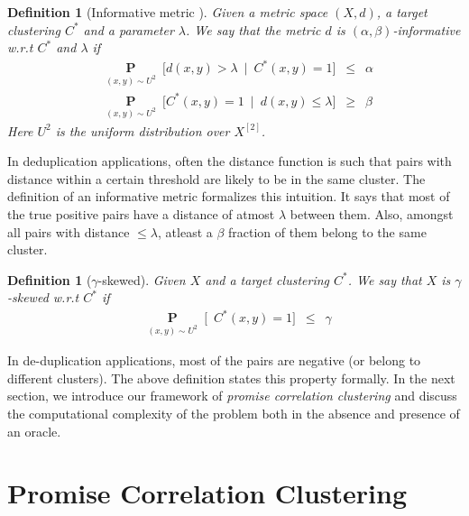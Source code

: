 \documentclass[12pt]{article}
\newtheorem{definition}[theorem]{Definition}
\newcommand{\mb}{\mathbf}
\begin{document}
\begin{definition}[Informative metric \cite{kushagra2018semisupervised}]
\label{defn:informativeMetric}
Given a metric space $(X, d)$, a target clustering $C^*$ and a parameter $\lambda$. We say that the metric $d$ is $(\alpha, \beta)$-informative w.r.t $C^*$ and $\lambda$ if
\begin{align}
	&\underset{(x, y) \sim U^2}{\mb P}\enspace \big[d(x, y) > \lambda \enspace|\enspace C^*(x, y) = 1\big] \enspace \le \enspace \alpha \label{eqn:alphaInformative}\\
	&\underset{(x, y) \sim U^2}{\mb P}\enspace \big[C^*(x, y) = 1 \enspace|\enspace d(x, y) \le \lambda \big] \enspace \ge \enspace \beta \label{eqn:betaInformative}
\end{align}
Here $U^2$ is the uniform distribution over $X^{[2]}$. 
\end{definition} 
In deduplication applications, often the distance function is such that pairs with distance within a certain threshold are likely to be in the same cluster. The definition of an informative metric formalizes this intuition. It says that most of the true positive pairs have a distance of atmost $\lambda$ between them. Also, amongst all pairs with distance $\le \lambda$, atleast a $\beta$ fraction of them belong to the same cluster. 

\begin{definition}[$\gamma$-skewed] 
\label{defn:gammaskewed} 
Given $X$ and a target clustering $C^*$. We say that $X$ is $\gamma$-skewed w.r.t $C^*$ if 
\begin{align*}
	&\underset{(x, y) \sim U^2}{\mb P}\enspace \big[\enspace C^*(x, y) = 1 \big] \enspace \le \enspace \gamma
\end{align*}
\end{definition}
In de-duplication applications, most of the pairs are negative (or belong to different clusters). The above definition states this property formally. In the next section, we introduce our framework of \textit{promise correlation clustering} and discuss the computational complexity of the problem both in the absence and presence of an oracle.   

\section{Promise Correlation Clustering}
\label{section:PCC}
\end{document}
